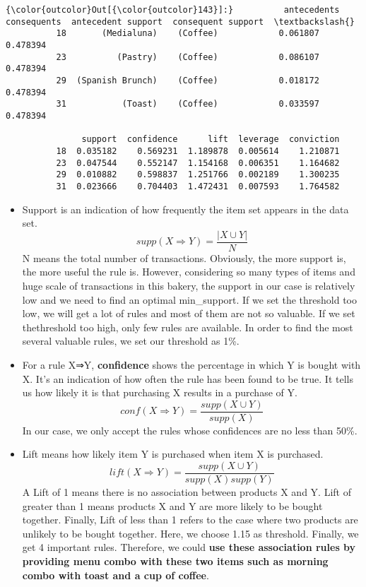 \documentclass[11pt]{article}
\providecommand{\tightlist}{%
      \setlength{\itemsep}{0pt}\setlength{\parskip}{0pt}}
\begin{document}
\begin{Verbatim}[commandchars=\\\{\}]
{\color{outcolor}Out[{\color{outcolor}143}]:}          antecedents consequents  antecedent support  consequent support  \textbackslash{}
          18       (Medialuna)    (Coffee)            0.061807            0.478394   
          23          (Pastry)    (Coffee)            0.086107            0.478394   
          29  (Spanish Brunch)    (Coffee)            0.018172            0.478394   
          31           (Toast)    (Coffee)            0.033597            0.478394   
          
               support  confidence      lift  leverage  conviction  
          18  0.035182    0.569231  1.189878  0.005614    1.210871  
          23  0.047544    0.552147  1.154168  0.006351    1.164682  
          29  0.010882    0.598837  1.251766  0.002189    1.300235  
          31  0.023666    0.704403  1.472431  0.007593    1.764582  
\end{Verbatim}
            
    \begin{itemize}
\tightlist
\item
  Support is an indication of how frequently the item set appears in the
  data set. \[supp(X⇒Y)=\frac{|X \cup Y|}{N}\] N means the total number
  of transactions. Obviously, the more support is, the more useful the
  rule is. However, considering so many types of items and huge scale of
  transactions in this bakery, the support in our case is relatively low
  and we need to find an optimal min\_support. If we set the threshold
  too low, we will get a lot of rules and most of them are not so
  valuable. If we set thethreshold too high, only few rules are
  available. In order to find the most several valuable rules, we set
  our threshold as 1\%.
\item
  For a rule X⇒Y, \textbf{confidence} shows the percentage in which Y is
  bought with X. It's an indication of how often the rule has been found
  to be true. It tells us how likely it is that purchasing X results in
  a purchase of Y. \[conf(X⇒Y)=\frac{supp(X \cup Y)}{supp(X)}\] In our
  case, we only accept the rules whose confidences are no less than
  50\%.
\item
  Lift means how likely item Y is purchased when item X is purchased.
  \[lift(X⇒Y)=\frac{supp(X \cup Y)}{supp(X) supp(Y)}\] A Lift of 1 means
  there is no association between products X and Y. Lift of greater than
  1 means products X and Y are more likely to be bought together.
  Finally, Lift of less than 1 refers to the case where two products are
  unlikely to be bought together. Here, we choose 1.15 as threshold.
  Finally, we get 4 important rules. Therefore, we could \textbf{use
  these association rules by providing menu combo with these two items
  such as morning combo with toast and a cup of coffee}.
\end{itemize}
\end{document}
